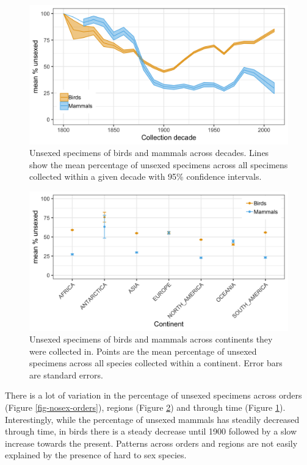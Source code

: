 \documentclass[a4paper, 12pt]{article}
\begin{document}
\begin{figure}[H]
 \centering
  \includegraphics[width = \linewidth]{figures/nosex-through-time.png}
  \caption{Unsexed specimens of birds and mammals across decades. 
  Lines show the mean percentage of unsexed specimens across all specimens collected within a given decade with 95\% confidence intervals.}
  \label{fig-nosex-decade}
\end{figure}

\begin{figure}[H]
 \centering
  \includegraphics[width = \linewidth]{figures/nosex-regions.png}
  \caption{Unsexed specimens of birds and mammals across continents they were collected in. 
  Points are the mean percentage of unsexed specimens across all species collected within a continent. 
  Error bars are standard errors.}
  \label{fig-nosex-continent}
\end{figure}

There is a lot of variation in the percentage of unsexed specimens across orders (Figure \ref{fig-nosex-orders}), regions (Figure \ref{fig-nosex-continent}) and through time (Figure \ref{fig-nosex-decade}). 
Interestingly, while the percentage of unsexed mammals has steadily decreased through time, in birds there is a steady decrease until 1900 followed by a slow increase towards the present. 
Patterns across orders and regions are not easily explained by the presence of hard to sex species.
\end{document}
